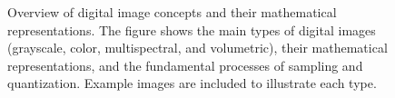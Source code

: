 \begin{figure}[htbp]
  \caption{Overview of digital image concepts and their mathematical
    representations. The figure shows the main types of digital images
    (grayscale, color, multispectral, and volumetric), their
    mathematical representations, and the fundamental processes of
    sampling and quantization. Example images are included to
  illustrate each type.}
  \label{fig:image_concepts}
\end{figure}